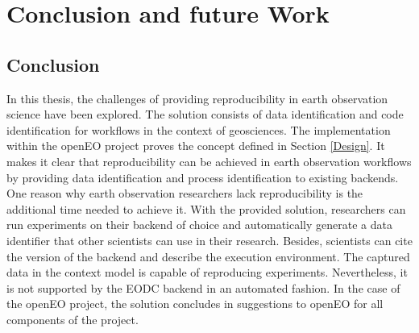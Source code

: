 \documentclass[draft,final]{vutinfth} %
\begin{document}
\chapter{Conclusion and future Work}\label{Conclusion}

\section{Conclusion}

In this thesis, the challenges of providing reproducibility in earth observation science have been explored. The solution consists of data identification and code identification for workflows in the context of geosciences. The implementation within the openEO project proves the concept defined in Section \ref{Design}. It makes it clear that reproducibility can be achieved in earth observation workflows by providing data identification and process identification to existing backends. One reason why earth observation researchers lack reproducibility is the additional time needed to achieve it. With the provided solution, researchers can run experiments on their backend of choice and automatically generate a data identifier that other scientists can use in their research. Besides, scientists can cite the version of the backend and describe the execution environment. The captured data in the context model is capable of reproducing experiments. Nevertheless, it is not supported by the EODC backend in an automated fashion. In the case of the openEO project, the solution concludes in suggestions to openEO for all components of the project.  
\end{document}
